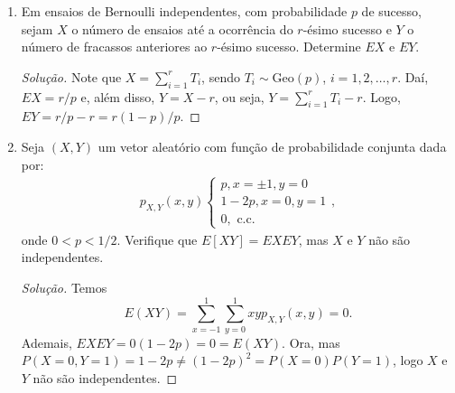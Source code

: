 \documentclass[../Notas.tex]{subfiles}
\begin{document}
\begin{enumerate}
\begin{proof}[Solução]
\begin{enumerate}[a)]
            após algumas simplificações.
        \end{enumerate}
    \end{proof}
    \item Em ensaios de Bernoulli independentes, com probabilidade $p$ de sucesso, sejam $X$ o número de ensaios até a ocorrência do $r$-ésimo sucesso e $Y$ o número de fracassos anteriores ao $r$-ésimo sucesso. Determine $EX$ e $EY$.
    \begin{proof}[Solução]
        Note que $X = \sum_{i=1}^r T_i$, sendo $T_i\sim\text{Geo}(p)$, $i=1,2,\dots,r$.
        Daí, $EX = r/p$ e, além disso, $Y = X-r$, ou seja, $Y = \sum_{i=1}^r T_i - r$.
        Logo, $EY = r/p - r = r(1-p)/p$.
    \end{proof}
    \item Seja $(X,Y)$ um vetor aleatório com função de probabilidade conjunta dada por:
    \begin{align*}
        p_{X,Y}(x,y)\begin{cases}
            p, x = \pm 1, y = 0 \\
            1-2p, x = 0, y = 1 \\
            0, \text{ c.c.}
        \end{cases},
    \end{align*}
    onde $0 < p < 1/2$. Verifique que $E[XY] = EXEY$, mas $X$ e $Y$ não são independentes.
    \begin{proof}[Solução]
        Temos
        \[
        E(XY) = \sum_{x=-1}^1\sum_{y=0}^1 xyp_{X,Y}(x,y) = 0.
        \]
        Ademais, $EXEY = 0(1-2p) = 0 = E(XY)$. Ora, mas 
        $P(X=0, Y=1) = 1-2p \neq (1-2p)^2 = P(X=0)P(Y=1)$, logo $X$ e $Y$ não são independentes.
    \end{proof}
\end{enumerate}
\end{document}
